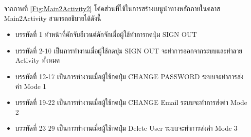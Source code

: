 	จากภาพที่ \ref{Fig:Main2Activity2} โค้ดส่วนที่ใช้ในการสร้างเมนูนำทางหลักภายในคลาส Main2Activity สามารถอธิบายได้ดังนี้
	\begin{itemize}[label={--}]
		\item บรรทัดที่ 1 ทำหน้าที่ดักจับอีเวนต์ดักจักเมื่อผู้ใช้ทำการกดปุ่ม SIGN OUT
		\item บรรทัดที่ 2-10  เป็นการทำงานเมื่อผู้ใช้กดปุ่ม SIGN OUT  จะทำการออกจากระบบและทำลาย Activity ทั้งหมด
		\item บรรทัดที่ 12-17 เป็นการทำงานเมื่อผู้ใช้กดปุ่ม CHANGE PASSWORD ระบบจะทำการส่งค่า Mode 1
		\item บรรทัดที่ 19-22 เป็นการทำงานเมื่อผู้ใช้กดปุ่ม CHANGE Email ระบบจะทำการส่งค่า Mode 2
		\item บรรทัดที่ 23-29 เป็นการทำงานเมื่อผู้ใช้กดปุ่ม Delete User ระบบจะทำการส่งค่า Mode 3
	\end{itemize}
	
